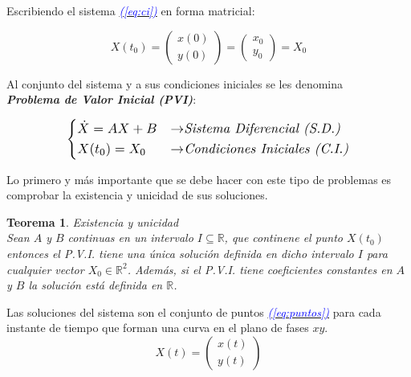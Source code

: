 \documentclass[12pt,a4paper]{report} %
\newtheorem{theorem}{Teorema}
\newcommand{\eref}[1]{\hyperref[#1]{\textcolor{blue}{\textit{(\ref*{#1})}}}}
\begin{document}
	Escribiendo el sistema \eref{eq:ci} en forma matricial:
	
	\begin{equation}
		\label{cimat}
		X(t_0)=\begin{pmatrix}
			x(0)\\y(0)
		\end{pmatrix}=\begin{pmatrix}
		x_0\\y_0
		\end{pmatrix}=X_0
	\end{equation}\smallskip
	
	Al conjunto del sistema y a sus condiciones iniciales se les denomina \\ \textbf{\textit{Problema de Valor Inicial (PVI)}}: 
	
	\begin{equation}
	\label{eq:pvi}
	\scalebox{1.2}{$\displaystyle
		\left\{
		\begin{aligned}
			&\dot{X}=AX+B &\rightarrow& \textit{Sistema Diferencial (S.D.)}\\
			&X(t_0)=X_0 &\rightarrow& \textit{Condiciones Iniciales (C.I.)}
		\end{aligned}
		\right.
		$}
    \end{equation}\smallskip
	
	Lo primero y más importante que se debe hacer con este tipo de problemas es comprobar la existencia y unicidad de sus soluciones.
	\newpage
	\begin{theorem}\label{thm:interesante}
		Existencia y unicidad \\[2mm]
		\textit{Sean $A$ y $B$ continuas en un intervalo $I\subseteq  \mathbb{R}$, que continene el punto $X(t_0)$ entonces el P.V.I. tiene una única solución definida en dicho intervalo $I$ para cualquier vector $X_0 \in \mathbb{R}^2$}. Además, si el P.V.I. tiene coeficientes constantes en $A$ y $B$ la solución está definida en $\mathbb{R}$.
	\end{theorem}
	\vspace{4mm}
	
	Las soluciones del sistema son el conjunto de puntos \eref{eq:puntos} para cada instante de tiempo que forman una curva en el plano de fases $xy$.
	\begin{equation}
		\label{eq:puntos}
		X(t)=\begin{pmatrix}
			x(t) \\ y(t)
		\end{pmatrix}
	\end{equation}\smallskip
	
\end{document}
